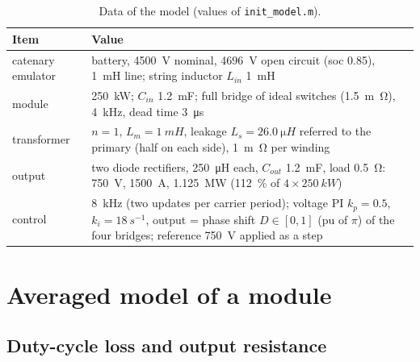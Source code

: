 \documentclass[10pt,a4paper]{scrartcl}
\newcommand{\code}[1]{\texttt{#1}}
\newcommand{\Ls}{L_s}
\begin{document}
\begin{onehalfspace}
\begin{table}[htb]
\centering
\caption{Data of the model (values of \code{init\_model.m}).}
\label{tab:data}
\small
\begin{tabularx}{\textwidth}{@{}l>{\raggedright\arraybackslash}X@{}}
\toprule
Item & Value \\
\midrule
catenary emulator & battery, \SI{4500}{V} nominal, \SI{4696}{V} open circuit (soc 0.85), \SI{1}{mH} line; string inductor $L_{in}$ \SI{1}{mH} \\
module & \SI{250}{kW}; $C_{in}$ \SI{1.2}{mF}; full bridge of ideal switches (\SI{1.5}{m\ohm}), \SI{4}{kHz}, dead time \SI{3}{\micro s} \\
transformer & $n = 1$, $L_m = \SI{1}{mH}$, leakage $\Ls = \SI{26.0}{\micro H}$ referred to the primary (half on each side), \SI{1}{m\ohm} per winding \\
output & two diode rectifiers, \SI{250}{\micro H} each, $C_{out}$ \SI{1.2}{mF}, load \SI{0.5}{\ohm}: \SI{750}{V}, \SI{1500}{A}, \SI{1.125}{MW} (\SI{112}{\percent} of $4\times\SI{250}{kW}$) \\
control & \SI{8}{kHz} (two updates per carrier period); voltage PI $k_p = 0.5$, $k_i = \SI{18}{s^{-1}}$, output = phase shift $D \in [0,1]$ (pu of $\pi$) of the four bridges; reference \SI{750}{V} applied as a step \\
\bottomrule
\end{tabularx}
\end{table}

\section{Averaged model of a module}
\label{sec:averaged}

\subsection{Duty-cycle loss and output resistance}


\end{onehalfspace}
\end{document}
